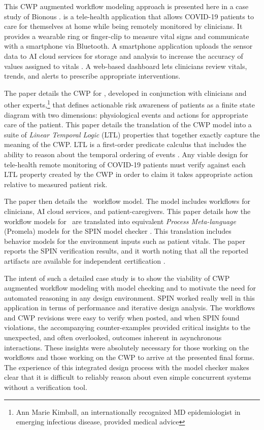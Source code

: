 This CWP augmented workflow modeling approach is presented here in a case study of Bionous \phware. \phware is a tele-health application that allows COVID-19 patients to care for themselves at home while being remotely monitored by clinicians. It provides a wearable ring or finger-clip to measure vital signs and communicate with a smartphone via Bluetooth. A smartphone application uploads the sensor data to AI cloud services for storage and analysis to increase the accuracy of values assigned to vitals \cite{Altschul2004PredictiveMI,10.2307/2984877,10.5555/1643031.1643047}. A web-based dashboard lets clinicians review vitals, trends, and alerts to prescribe appropriate interventions. 

The paper details the CWP for \phware, developed in conjunction with clinicians and other experts,\footnote{Ann Marie Kimball, an internationally recognized MD epidemiologist in emerging infectious disease, provided medical advice} that defines actionable risk awareness of patients as a finite state diagram with two dimensions: physiological events and actions for appropriate care of the patient. This paper details the translation of the CWP model into a suite of \emph{Linear Temporal Logic} (LTL) properties that together exactly capture the meaning of the CWP. LTL is a first-order predicate calculus that includes the ability to reason about the temporal ordering of events \cite{10.5555/975331}. Any viable design for tele-health remote monitoring of COVID-19 patients must verify against each LTL property created by the CWP in order to claim it takes appropriate action relative to measured patient risk.

The paper then details the \phware\ workflow model. The model includes workflows for clinicians, AI cloud services, and patient-caregivers. This paper details how the workflow models for \phware\ are translated into equivalent \emph{Process Meta-language} (Promela) models for the SPIN model checker \cite{spin}. This translation includes behavior models for the environment inputs such as patient vitals. The paper reports the SPIN verification results, and it worth noting that all the reported artifacts are available for independent certification \cite{repo}.

The intent of such a detailed case study is to show the viability of CWP augmented workflow modeling with model checking and to motivate the need for automated reasoning in any design environment. SPIN worked really well in this application in terms of performance and iterative design analysis. The workflows and CWP revisions were easy to verify when posted, and when SPIN found violations, the accompanying counter-examples provided critical insights to the unexpected, and often overlooked, outcomes inherent in asynchronous interactions. These insights were absolutely necessary for those working on the workflows and those working on the CWP to arrive at the presented final forms. The experience of this integrated design process with the model checker makes clear that it is difficult to reliably reason about even simple concurrent systems without a verification tool.

